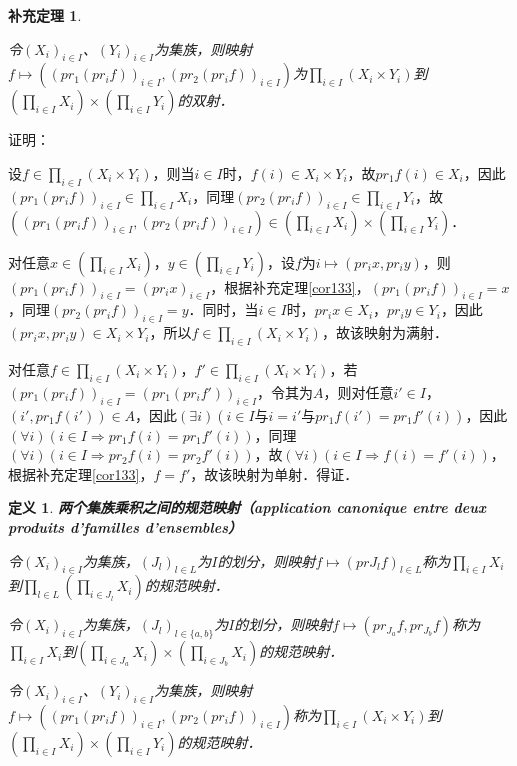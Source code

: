 \documentclass[12pt, a4paper, oneside]{book}
\newtheorem{cor}{补充定理}
\newtheorem{de}{定义}
\begin{document}
			\begin{cor}\label{cor139}
				\hfill\par
				令$(X_i)_{i\in I}$、$(Y_i)_{i\in I}$为集族，则映射$f\mapsto ((pr_1(pr_if))_{i\in I}, (pr_2(pr_if))_{i\in I})$为$\prod\limits_{i\in I}(X_i\times Y_i)$到\\$(\prod\limits_{i\in I}X_i)\times (\prod\limits_{i\in I}Y_i)$的双射．
			\end{cor}
			证明：
			\par
			设$f\in \prod\limits_{i\in I}(X_i\times Y_i)$，则当$i\in I$时，$f(i)\in X_i\times Y_i$，故$pr_1f(i)\in X_i$，因此$(pr_1(pr_if))_{i\in I}\in \prod\limits_{i\in I}X_i$，同理$(pr_2(pr_if))_{i\in I}\in \prod\limits_{i\in I}Y_i$，故$((pr_1(pr_if))_{i\in I}, (pr_2(pr_if))_{i\in I})\in (\prod\limits_{i\in I}X_i)\times (\prod\limits_{i\in I}Y_i)$．
			\par
			对任意$x\in (\prod\limits_{i\in I}X_i)$，$y\in (\prod\limits_{i\in I}Y_i)$，设$f$为$i\mapsto (pr_ix, pr_iy)$，则$(pr_1(pr_if))_{i\in I}=(pr_ix)_{i\in I}$，根据补充定理\ref{cor133}，$(pr_1(pr_if))_{i\in I}=x$，同理$(pr_2(pr_if))_{i\in I}=y$．同时，当$i\in I$时，$pr_ix \in X_i$，$pr_iy \in Y_i$，因此$(pr_ix, pr_iy)\in X_i \times Y_i$，所以$f\in \prod\limits_{i\in I}(X_i\times Y_i)$，故该映射为满射．
			\par
			对任意$f\in \prod\limits_{i\in I}(X_i\times Y_i)$，$f'\in \prod\limits_{i\in I}(X_i\times Y_i)$，若$(pr_1(pr_if))_{i\in I}=(pr_1(pr_if'))_{i\in I}$，令其为$A$，则对任意$i'\in I$，$(i', pr_1f(i'))\in A$，因此$(\exists i)(i\in I\text{与}i=i'\text{与}pr_1f(i')=pr_1f'(i))$，因此$(\forall i)(i\in I\Rightarrow pr_1f(i)=pr_1f'(i))$，同理$(\forall i)(i\in I\Rightarrow pr_2f(i)=pr_2f'(i))$，故$(\forall i)(i\in I\Rightarrow f(i)=f'(i))$，根据补充定理\ref{cor133}，$f=f'$，故该映射为单射．得证．
			
			\begin{de}
				\textbf{两个集族乘积之间的规范映射（application canonique entre deux produits d'familles d'ensembles）}
				\par
				令$(X_i)_{i\in I}$为集族，$(J_l)_{l\in L}$为$I$的划分，则映射$f\mapsto (prJ_lf)_{l\in L}$称为$\prod\limits_{i\in I}X_i$到$\prod\limits_{l\in L}(\prod\limits_{i\in J_l}X_i)$的规范映射．
				\par
				令$(X_i)_{i\in I}$为集族，$(J_l)_{l\in \{a, b\}}$为$I$的划分，则映射$f\mapsto (pr_{J_a}f, pr_{J_b}f)$称为$\prod\limits_{i\in I}X_i$到$(\prod\limits_{i\in J_a}X_i)\times (\prod\limits_{i\in J_b}X_i)$的规范映射．
				\par
				令$(X_i)_{i\in I}$、$(Y_i)_{i\in I}$为集族，则映射$f\mapsto ((pr_1(pr_if))_{i\in I}, (pr_2(pr_if))_{i\in I})$称为$\prod\limits_{i\in I}(X_i\times Y_i)$到\\$(\prod\limits_{i\in I}X_i)\times (\prod\limits_{i\in I}Y_i)$的规范映射．
			\end{de}
			
\end{document}
